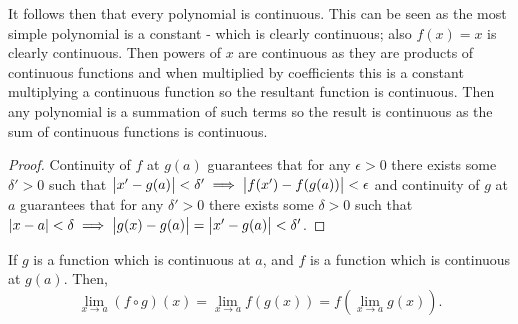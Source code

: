 \documentclass[../MathsNotesBase.tex]{subfiles}
\begin{document}
	\begin{corollary}
		It follows then that every polynomial is continuous. This can be seen as the most simple polynomial is a constant - which is clearly continuous; also ${ f(x) = x }$ is clearly continuous. Then powers of $x$ are continuous as they are products of continuous functions and when multiplied by coefficients this is a constant multiplying a continuous function so the resultant function is continuous. Then any polynomial is a summation of such terms so the result is continuous as the sum of continuous functions is continuous.
	\end{corollary}

	\begin{proof}
		Continuity of $f$ at $g(a)$ guarantees that for any ${ \epsilon > 0 }$ there exists some ${ \delta' > 0 }$ such that ${ \left\lvert x' - g(a)\right\rvert < \delta' \implies \left\lvert f(x') - f(g(a))\right\rvert < \epsilon }$ and continuity of $g$ at $a$ guarantees that for any ${ \delta' > 0 }$ there exists some ${ \delta > 0 }$ such that ${ \left\lvert x - a\right\rvert < \delta \implies \left\lvert g(x) - g(a)\right\rvert = \left\lvert x' - g(a)\right\rvert < \delta' }$.
	\end{proof}
	\begin{corollary}
		If $ g $ is a function which is continuous at $ a $, and $ f $ is a function which is
		continuous at $ g(a) $. Then,
		\[ \lim_{x \to a} (f \circ g)(x) = \lim_{x \to a} f(g(x)) = f(\lim_{x \to a} g(x)). \]
	\end{corollary}

	\bigskip
\end{document}

